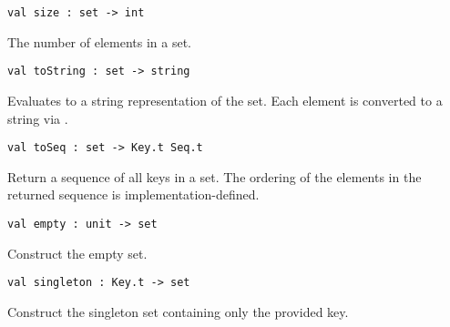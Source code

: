 \begin{cluster}
\label{grp:grm:set-interface::size}

\begin{gram}[size]
\label{grm:set-interface::size}
\begin{verbatim}
val size : set -> int
\end{verbatim}
The number of elements in a set.

\end{gram}
\end{cluster}

\begin{cluster}
\label{grp:grm:set-interface::tostring}

\begin{gram}[toString]
\label{grm:set-interface::tostring}
\begin{verbatim}
val toString : set -> string
\end{verbatim}
Evaluates to a string representation of the set. Each element is converted to
a string via .

\end{gram}
\end{cluster}

\begin{cluster}
\label{grp:grm:set-interface::toseq}

\begin{gram}[toSeq]
\label{grm:set-interface::toseq}
\begin{verbatim}
val toSeq : set -> Key.t Seq.t
\end{verbatim}
Return a sequence of all keys in a set. The ordering of the elements in the
returned sequence is implementation-defined.

\end{gram}
\end{cluster}

\begin{cluster}
\label{grp:grm:set-interface::empty}

\begin{gram}[empty]
\label{grm:set-interface::empty}
\begin{verbatim}
val empty : unit -> set
\end{verbatim}
Construct the empty set.

\end{gram}
\end{cluster}

\begin{cluster}
\label{grp:gr:set-interface:singleton}

\begin{gram}[singleton]
\label{gr:set-interface:singleton}
\begin{verbatim}
val singleton : Key.t -> set
\end{verbatim}
Construct the singleton set containing only the provided key.

\end{gram}
\end{cluster}

